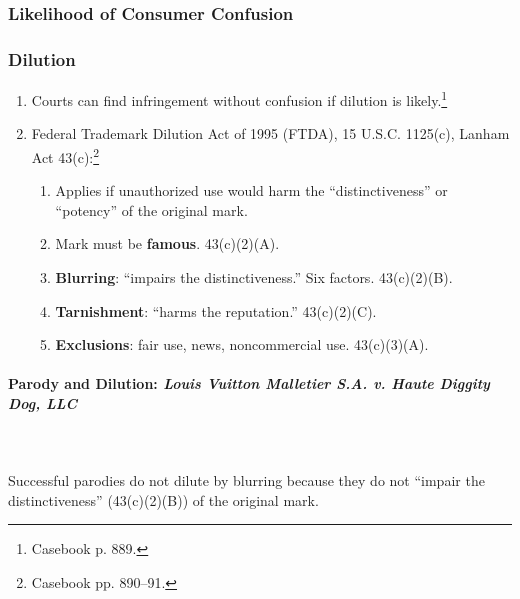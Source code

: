 
\subsubsection{Likelihood of Consumer Confusion}


\subsubsection{Dilution}

\begin{enumerate}
    \item Courts can find infringement without confusion if dilution is 
    likely.\footnote{Casebook p. 889.}
    \item Federal Trademark Dilution Act of 1995 (FTDA), 15 U.S.C. 1125(c), 
    Lanham Act 43(c):\footnote{Casebook pp. 890--91.}
    \begin{enumerate}
        \item Applies if unauthorized use would harm the ``distinctiveness'' 
        or ``potency'' of the original mark.
        \item Mark must be \textbf{famous}. 43(c)(2)(A).
        \item \textbf{Blurring}: ``impairs the distinctiveness.'' Six factors. 
        43(c)(2)(B).
        \item \textbf{Tarnishment}: ``harms the reputation.'' 43(c)(2)(C).
        \item \textbf{Exclusions}: fair use, news, noncommercial use. 
        43(c)(3)(A).  \end{enumerate}
\end{enumerate}

\paragraph{Parody and Dilution: \emph{Louis Vuitton Malletier S.A. v. Haute 
Diggity Dog, LLC}}
~\\\\
Successful parodies do not dilute by blurring because they 
do not ``impair the distinctiveness'' (43(c)(2)(B)) of the original mark.

